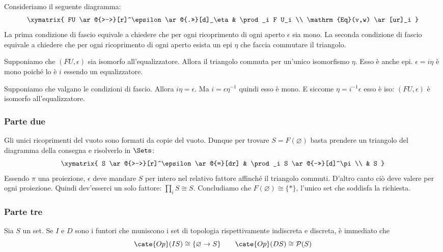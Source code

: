 Consideriamo il seguente diagramma:
\[\xymatrix{
FU \ar@{>->}[r]^\epsilon \ar@{.>>}[d]_\eta & \prod_i F U_i \\
\mathrm{Eq}(v,w) \ar[ur]_i
}\]
La prima condizione di fascio equivale a chiedere che per ogni ricoprimento di ogni aperto $\epsilon$ sia mono. La seconda condizione di fascio equivale a chiedere che per ogni ricoprimento di ogni aperto esista un epi $\eta$ che faccia commutare il triangolo.

Supponiamo che $(FU,\epsilon)$ sia isomorfo all'equalizzatore.
Allora il triangolo commuta per un'unico isomorfismo $\eta$.
Esso è anche epi.
$\epsilon=i\eta$ è mono poiché lo è $i$ essendo un equalizzatore.

Supponiamo che valgano le condizioni di fascio.
Allora $i\eta=\epsilon$.
Ma $i=\epsilon\eta^{-1}$ quindi esso è mono.
E siccome $\eta=i^{-1}\epsilon$ esso è iso: $(FU,\epsilon)$ è isomorfo all'equalizzatore.





\subsubsection*{Parte due}

Gli unici ricoprimenti del vuoto sono formati da copie del vuoto.
Dunque per trovare $S=F(\varnothing)$ basta prendere un triangolo del diagramma della consegna e risolverlo in $\Sets$:
\[\xymatrix{
S \ar@{>->}[r]^\epsilon \ar@{=}[dr] & \prod_i S \ar@{->>}[d]^\pi \\
& S
}\]
Essendo $\pi$ una proiezione, $\epsilon$ deve mandare $S$ per intero nel relativo fattore affinché il triangolo commuti.
D'altro canto ciò deve valere per ogni proiezione.
Quindi dev'esserci un solo fattore: $\prod_i S\cong S$.
Concludiamo che $F(\varnothing)\cong \{*\}$, l'unico set che soddisfa la richiesta.




\subsubsection*{Parte tre}

Sia $S$ un set.
Se $I$ e $D$ sono i funtori che muniscono i set di topologia rispettivamente indiscreta e discreta, è immediato che
\[
\cate{Op}(IS)\cong\{\varnothing \to S\}
\qquad
\cate{Op}(DS)\cong\mathcal P(S)
\]

